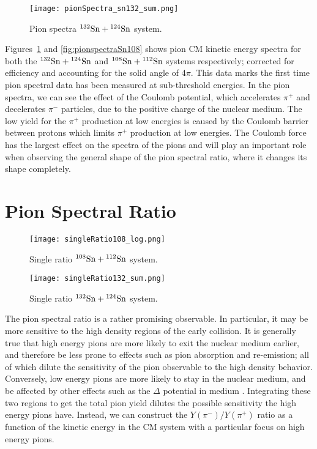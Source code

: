 \begin{figure}[!htb]
\centering
\texttt{[image: pionSpectra\_sn132\_sum.png]}
\caption{Pion spectra ${}^{132}\mathrm{Sn} + {}^{124}\mathrm{Sn}$ system. }
\label{fig:pionspectraSn132}
\end{figure}


Figures~\ref{fig:pionspectraSn132} and \ref{fig:pionspectraSn108} shows pion CM kinetic energy spectra for both the ${}^{132}\mathrm{Sn} + {}^{124}\mathrm{Sn}$ and ${}^{108}\mathrm{Sn} + {}^{112}\mathrm{Sn}$ systems respectively; corrected for efficiency and accounting for the solid angle of 4$\pi$. This data marks the first time pion spectral data has been measured at sub-threshold energies. In the pion spectra, we can see the effect of the Coulomb potential, which accelerates $\pi^+$ and decelerates $\pi^-$ particles, due to the positive charge of the nuclear medium. The low yield for the $\pi^+$ production at low energies is caused by the Coulomb barrier between protons which limits $\pi^+$ production at low energies. The Coulomb force has the largest effect on the spectra of the pions and will play an important role when observing the general shape of the pion spectral ratio, where it changes its shape completely. 



\section{Pion Spectral Ratio}

\begin{figure}[!htb]
\centering
\texttt{[image: singleRatio108\_log.png]}
\caption{Single ratio ${}^{108}\mathrm{Sn} + {}^{112}\mathrm{Sn}$ system.}
\label{fig:SRsn108}
\end{figure}

\begin{figure}[!htb]
\centering
\texttt{[image: singleRatio132\_sum.png]}
\caption{Single ratio ${}^{132}\mathrm{Sn} + {}^{124}\mathrm{Sn}$ system.}
\label{fig:SRsn132}
\end{figure}

The pion spectral ratio is a rather promising observable. In particular, it may be more sensitive to the high density regions of the early collision. It is generally true that high energy pions are more likely to exit the nuclear medium  earlier, and therefore be less prone to effects such as pion absorption and re-emission; all of which dilute the sensitivity of the pion observable to the high density behavior. Conversely, low energy pions are more likely to stay in the nuclear medium, and be affected by other effects such as the $\Delta$ potential in medium \cite{baoan_deltapotential}. Integrating these two regions to get the total pion yield dilutes the possible sensitivity the high energy pions have. Instead, we can construct the $Y(\pi^-)/Y(\pi^+)$ ratio as a function of the kinetic energy in the CM system with a particular focus on high energy pions.

